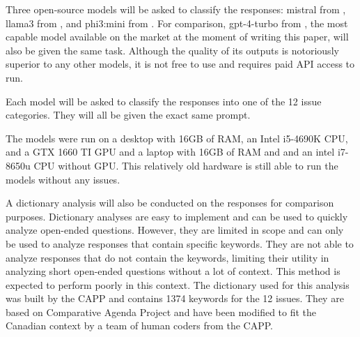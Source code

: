\documentclass[
  authoryear,
  preprint,
  3p]{elsarticle}
\newenvironment{Shaded}{\begin{snugshade}}{\end{snugshade}}
\newcommand{\FunctionTok}[1]{\textcolor[rgb]{0.28,0.35,0.67}{#1}}
\newcommand{\NormalTok}[1]{\textcolor[rgb]{0.00,0.23,0.31}{#1}}
\newcommand{\OtherTok}[1]{\textcolor[rgb]{0.00,0.23,0.31}{#1}}
\newcommand{\SpecialCharTok}[1]{\textcolor[rgb]{0.37,0.37,0.37}{#1}}
\newcommand{\StringTok}[1]{\textcolor[rgb]{0.13,0.47,0.30}{#1}}
\begin{document}
Three open-source models will be asked to classify the responses:
mistral from \citet{jiang_etal23}, llama3 from \citet{meta24}, and
phi3:mini from \citet{abdin_etal24}. For comparison, gpt-4-turbo from
\citet{openai23b}, the most capable model available on the market at the
moment of writing this paper, will also be given the same task. Although
the quality of its outputs is notoriously superior to any other models,
it is not free to use and requires paid API access to run.

Each model will be asked to classify the responses into one of the 12
issue categories. They will all be given the exact same prompt.

\begin{Shaded}
\end{Shaded}

The models were run on a desktop with 16GB of RAM, an Intel i5-4690K
CPU, and a GTX 1660 TI GPU and a laptop with 16GB of RAM and and an
intel i7-8650u CPU without GPU. This relatively old hardware is still
able to run the models without any issues.

A dictionary analysis will also be conducted on the responses for
comparison purposes. Dictionary analyses are easy to implement and can
be used to quickly analyze open-ended questions. However, they are
limited in scope and can only be used to analyze responses that contain
specific keywords. They are not able to analyze responses that do not
contain the keywords, limiting their utility in analyzing short
open-ended questions without a lot of context. This method is expected
to perform poorly in this context. The dictionary used for this analysis
was built by the CAPP and contains 1374 keywords for the 12 issues. They
are based on \citet{sevenans_etal14} Comparative Agenda Project and have
been modified to fit the Canadian context by a team of human coders from
the CAPP.
\end{document}
